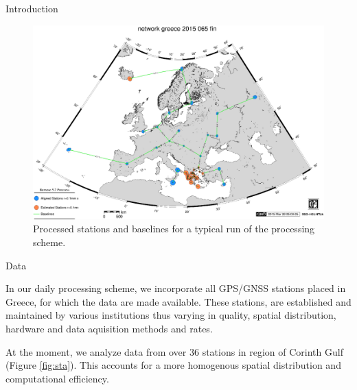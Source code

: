 \documentclass[final,a0,portrait]{beamer}
\newlength{\onecolwid}
\begin{document}
\begin{frame}[t]
\begin{columns}[t]
\begin{column}{\onecolwid}
\begin{block}{Introduction}
{}
\end{block}


\begin{figure}
    \includegraphics[width=0.7\onecolwid]{eu-greece-15065-fin-proc.eps}
    \caption{Processed stations and baselines for a typical run of the processing scheme.}
    \label{fig:proc-net}
\end{figure}
\begin{block}{Data}
{\small
In our daily processing scheme, we incorporate all GPS/GNSS stations placed in Greece, for which the data are made available. 
These stations, are established and maintained by various institutions thus varying in quality, spatial distribution, hardware and 
data aquisition methods and rates.

At the moment, we analyze data from over 36 stations in region of Corinth Gulf (Figure \ref{fig:sta}). 
This accounts for a more homogenous spatial distribution and computational efficiency.


}
\end{block}
\end{column}
\end{columns}
\end{frame}
\end{document}
